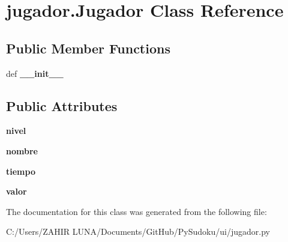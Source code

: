 \hypertarget{classjugador_1_1_jugador}{\section{jugador.\-Jugador Class Reference}
\label{classjugador_1_1_jugador}
}
\subsection*{Public Member Functions}
\begin{DoxyCompactItemize}
\item 
\hypertarget{classjugador_1_1_jugador_acd76dd6cca15ff1d47a0516f24ed82a8}{def {\bfseries \-\_\-\-\_\-init\-\_\-\-\_\-}}\label{classjugador_1_1_jugador_acd76dd6cca15ff1d47a0516f24ed82a8}

\end{DoxyCompactItemize}
\subsection*{Public Attributes}
\begin{DoxyCompactItemize}
\item 
\hypertarget{classjugador_1_1_jugador_a814299d846d18566c8ae46e5ce1d882c}{{\bfseries nivel}}\label{classjugador_1_1_jugador_a814299d846d18566c8ae46e5ce1d882c}

\item 
\hypertarget{classjugador_1_1_jugador_a1dbfc0544f5ccd6634c89ec8371ee334}{{\bfseries nombre}}\label{classjugador_1_1_jugador_a1dbfc0544f5ccd6634c89ec8371ee334}

\item 
\hypertarget{classjugador_1_1_jugador_abf922bf19bd357fa114e02540c74eac7}{{\bfseries tiempo}}\label{classjugador_1_1_jugador_abf922bf19bd357fa114e02540c74eac7}

\item 
\hypertarget{classjugador_1_1_jugador_adbac29c1b384134e07d2fafe2d38cf18}{{\bfseries valor}}\label{classjugador_1_1_jugador_adbac29c1b384134e07d2fafe2d38cf18}

\end{DoxyCompactItemize}


The documentation for this class was generated from the following file\-:\begin{DoxyCompactItemize}
\item 
C\-:/\-Users/\-Z\-A\-H\-I\-R  L\-U\-N\-A/\-Documents/\-Git\-Hub/\-Py\-Sudoku/ui/jugador.\-py\end{DoxyCompactItemize}
